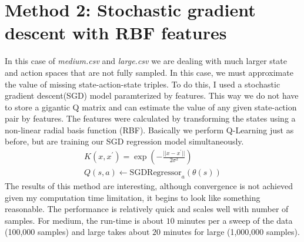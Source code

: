 \documentclass[12pt]{article}
\begin{document}
\section*{Method 2: Stochastic gradient descent with RBF features}
In this case of \textit{medium.csv} and \textit{large.csv} we are dealing with much larger state and action spaces that are not fully sampled. In this case, we must approximate the value of missing state-action-state triples. To do this, I used a stochastic gradient descent(SGD) model paramterized by features. This way we do not have to store a gigantic Q matrix and can estimate the value of any given state-action pair by features. The features were calculated by transforming the states using a non-linear radial basis function (RBF). Basically we perform Q-Learning just as before, but are training our SGD regression model simultaneously. 
\begin{align}
K(x,x^{'}) = \exp(-\frac{||x-x^{'}||}{2\sigma^2})\\
Q(s,a) \leftarrow \text{SGDRegressor}_a(\theta(s))
\end{align}
The results of this method are interesting, although convergence is not achieved given my computation time limitation, it begins to look like something reasonable. The performance is relatively quick and scales well with number of samples. For medium, the run-time is about $10$ minutes per a sweep of the data (100,000 samples) and large takes about $20$ minutes for large (1,000,000 samples).
\end{document}
